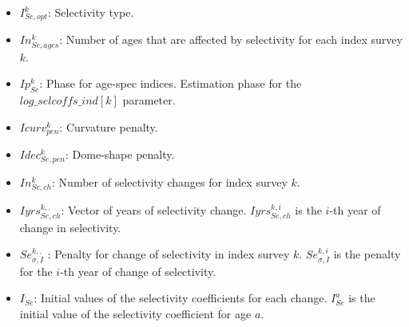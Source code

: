 \documentclass{article}
\begin{document}
\begin{itemize}
    \item $I_{Se,opt}^k$: Selectivity type.
     \item $In_{Se,ages}^k$: Number of ages that are affected by selectivity for each index survey $k$.
    \item $Ip_{Se}^k$: Phase for age-spec indices. Estimation phase for the $log\_selcoffs\_ind[k]$ parameter. 
    \item $Icurv_{pen}^k$: Curvature penalty.
    \item $Idec_{Se,pen}^k$: Dome-shape penalty. 
    \item $In_{Se,ch}^k$: Number of selectivity changes for index survey $k$.
     \item $Iyrs_{Se,ch}^{k,.}$: Vector of years of selectivity change. $Iyrs_{Se,ch}^{k,i}$ is the $i$-th year of change in selectivity. 
    \item $Se_{\sigma,I}^{k,.}$ : Penalty for change of selectivity in index survey $k$.  $Se_{\sigma,I}^{k,i}$ is the penalty for the $i$-th year of change of selectivity.
    \item $I_{Se}^{.}$: Initial values of the selectivity coefficients for each change. $I_{Se}^{a}$ is the initial value of the selectivity coefficient for age $a$.\\
    

\end{itemize}
\end{document}
